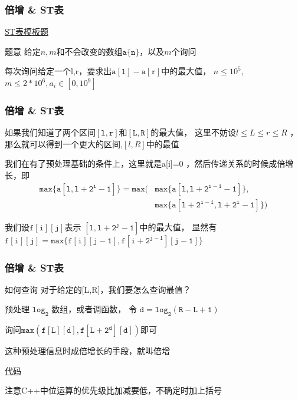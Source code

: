 \documentclass{beamer}
\begin{document}
  \begin{frame}
    \frametitle{倍增 \& ST表}
    \href{https://www.luogu.com.cn/problem/P3865}{ST表模板题}

    \vspace*{1\baselineskip}

    \begin{block}{题意}
      给定$n,m$和不会改变的数组$\mathtt{a\{n\}}$，以及$m$个询问

      每次询问给定一个l,r，要求出$\mathtt{a[l] - a[r]}$中的最大值，
      $n\leq 10^5$,$m\leq 2*10^6,a_i\in[0,10^9]$
    \end{block}
  \end{frame}

  \begin{frame}[fragile]
    \frametitle{倍增 \& ST表}

    如果我们知道了两个区间$\mathtt{[l,r]}$和$\mathtt{[L,R]}$的最大值，
    这里不妨设$l \leq L \leq r \leq R$
    ，那么就可以得到一个更大的区间,$[l,R]$中的最值

    \pause

    \vspace*{1\baselineskip}

    我们在有了预处理基础的条件上，这里就是a[i]=0
    ，然后传递关系的时候成倍增长，即
    \begin{align*}
      \mathtt{max\{a[l,l+2^i-1]\}=max(}
      &\mathtt{max\{a[l,l+2^{i-1}-1]\},} \\
      & \mathtt{max\{a[l+2^{i-1},l+2^i-1]\})}
    \end{align*}

    我们设$\mathtt{f[i][j]}$表示 $\mathtt{[l,l+2^j-1]}$中的最大值，
    显然有
    $\mathtt{f[i][j]=max\{f[i][j-1],f[i+2^{j-1}][j-1]\}}$
  \end{frame}

  \begin{frame}
    \frametitle{倍增 \& ST表}
    \begin{block}{如何查询}
      对于给定的[L,R]，我们要怎么查询最值？
    \end{block}

    \pause

    预处理 $\mathtt{log_2}$ 数组，或者调函数，
    令 $\mathtt{d=log_2{(R-L+1)}}$

    询问$\mathtt{max(f[L][d],f[L+2^d][d])}$即可

    \vspace*{1\baselineskip}
    
    这种预处理信息时成倍增长的手段，就叫倍增

    \vspace*{1\baselineskip}

    \href{http://syh521.cn/file/st-table.cpp}{代码}

    注意C++中位运算的优先级比加减要低，不确定时加上括号
  \end{frame}
\end{document}
